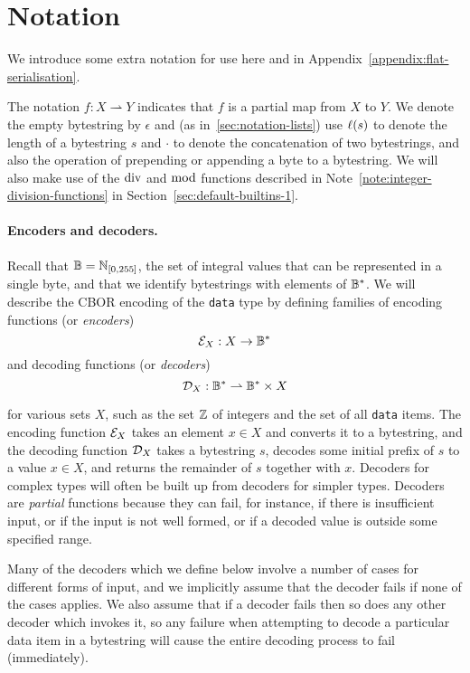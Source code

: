 \section{Notation}
We introduce some extra notation for use here and in
Appendix~\ref{appendix:flat-serialisation}.

\medskip 
\noindent The notation $f: X \rightharpoonup Y$ indicates that $f$ is a partial
map from $X$ to $Y$.  We denote the empty bytestring by $\epsilon$ and (as
in~\ref{sec:notation-lists}) use $\operatorname{\ell}(s)$ to denote the length of a
bytestring $s$ and $\cdot$ to denote the concatenation of two bytestrings, and
also the operation of prepending or appending a byte to a bytestring. We will
also make use of the $\operatorname{div}$ and $\operatorname{mod}$ functions described in
Note~\ref{note:integer-division-functions} in
Section~\ref{sec:default-builtins-1}.%

\paragraph{Encoders and decoders.}
Recall that $\mathbb{B} = \mathbb{N}_{[0,255]}$, the set of integral values that can
be represented in a single byte, and that we identify bytestrings with elements
of $\mathbb{B}^*$. We will describe the CBOR encoding of the \texttt{data} type by
defining families of encoding functions (or \textit{encoders})
$$
\mathcal{E}_X : X \rightarrow \mathbb{B}^*
$$%
and decoding functions (or \textit{decoders})
$$
\mathcal{D}_X : \mathbb{B}^* \rightharpoonup \mathbb{B}^* \times X
$$%

\noindent for various sets $X$, such as the set $\mathbb{Z}$ of integers and the set of
all \texttt{data} items.  The encoding function $\mathcal{E}_X$ takes an element $x \in
X$ and converts it to a bytestring, and the decoding function $\mathcal{D}_X$ takes a
bytestring $s$, decodes some initial prefix of $s$ to a value $x \in X$, and
returns the remainder of $s$ together with $x$.  Decoders for complex types will
often be built up from decoders for simpler types.  Decoders are
\textit{partial} functions because they can fail, for instance, if there is
insufficient input, or if the input is not well formed, or if a decoded value is
outside some specified range. 

Many of the decoders which we define below involve a number of cases for
different forms of input, and we implicitly assume that the decoder fails if
none of the cases applies.  We also assume that if a decoder fails then so does
any other decoder which invokes it, so any failure when attempting to decode a
particular data item in a bytestring will cause the entire decoding process to
fail (immediately).


